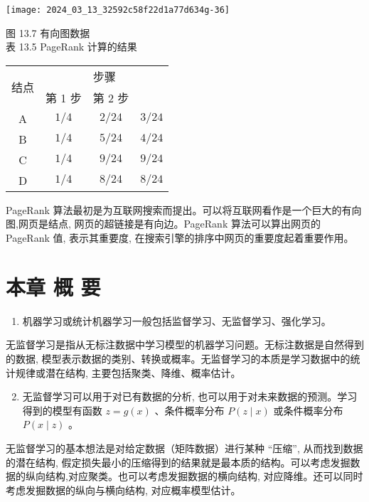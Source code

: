 \documentclass[10pt]{article}
\begin{document}
\begin{CJK*}{UTF8}{bsmi}
\begin{center}
\texttt{[image: 2024\_03\_13\_32592c58f22d1a77d634g-36]}
\end{center}

图 13.7 有向图数据\\
表 13.5 PageRank 计算的结果

\begin{center}
\begin{tabular}{c|ccc}
\hline
\multirow{2}{*}{结点} & \multicolumn{3}{|c}{步骤} \\
\cline { 2 - 4 }
 & 第 1 步 & 第 2 步 &  \\
\hline
A & $1 / 4$ & $2 / 24$ & $3 / 24$ \\
B & $1 / 4$ & $5 / 24$ & $4 / 24$ \\
C & $1 / 4$ & $9 / 24$ & $9 / 24$ \\
D & $1 / 4$ & $8 / 24$ & $8 / 24$ \\
\hline
\end{tabular}
\end{center}

PageRank 算法最初是为互联网搜索而提出。可以将互联网看作是一个巨大的有向图,网页是结点, 网页的超链接是有向边。PageRank 算法可以算出网页的 PageRank 值, 表示其重要度, 在搜索引擎的排序中网页的重要度起着重要作用。

\section*{本章 概 要}
\begin{enumerate}
  \item 机器学习或统计机器学习一般包括监督学习、无监督学习、强化学习。
\end{enumerate}

无监督学习是指从无标注数据中学习模型的机器学习问题。无标注数据是自然得到的数据, 模型表示数据的类别、转换或概率。无监督学习的本质是学习数据中的统计规律或潜在结构, 主要包括聚类、降维、概率估计。

\begin{enumerate}
  \setcounter{enumi}{1}
  \item 无监督学习可以用于对已有数据的分析, 也可以用于对未来数据的预测。学习得到的模型有函数 $z=g(x)$ 、条件概率分布 $P(z \mid x)$ 或条件概率分布 $P(x \mid z)$ 。
\end{enumerate}

无监督学习的基本想法是对给定数据（矩阵数据）进行某种 “压缩”, 从而找到数据的潜在结构, 假定损失最小的压缩得到的结果就是最本质的结构。可以考虑发掘数据的纵向结构,对应聚类。也可以考虑发掘数据的横向结构, 对应降维。还可以同时考虑发掘数据的纵向与横向结构, 对应概率模型估计。


\end{CJK*}
\end{document}
